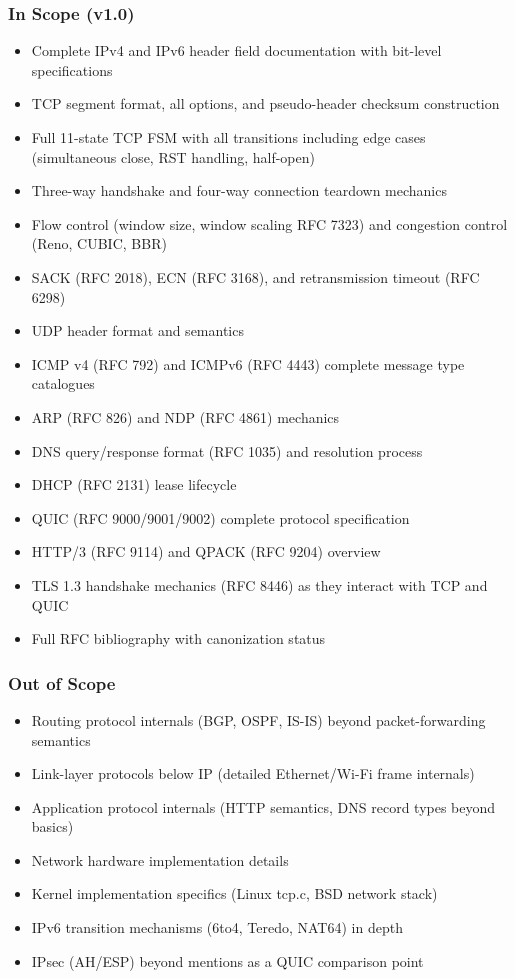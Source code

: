 \documentclass[11pt,letterpaper]{article}
\begin{document}
\subsubsection{In Scope (v1.0)}

\begin{itemize}[noitemsep]
  \item Complete IPv4 and IPv6 header field documentation with bit-level specifications
  \item TCP segment format, all options, and pseudo-header checksum construction
  \item Full 11-state TCP FSM with all transitions including edge cases (simultaneous close, RST handling, half-open)
  \item Three-way handshake and four-way connection teardown mechanics
  \item Flow control (window size, window scaling RFC 7323) and congestion control (Reno, CUBIC, BBR)
  \item SACK (RFC 2018), ECN (RFC 3168), and retransmission timeout (RFC 6298)
  \item UDP header format and semantics
  \item ICMP v4 (RFC 792) and ICMPv6 (RFC 4443) complete message type catalogues
  \item ARP (RFC 826) and NDP (RFC 4861) mechanics
  \item DNS query/response format (RFC 1035) and resolution process
  \item DHCP (RFC 2131) lease lifecycle
  \item QUIC (RFC 9000/9001/9002) complete protocol specification
  \item HTTP/3 (RFC 9114) and QPACK (RFC 9204) overview
  \item TLS 1.3 handshake mechanics (RFC 8446) as they interact with TCP and QUIC
  \item Full RFC bibliography with canonization status
\end{itemize}

\subsubsection{Out of Scope}

\begin{itemize}[noitemsep]
  \item Routing protocol internals (BGP, OSPF, IS-IS) beyond packet-forwarding semantics
  \item Link-layer protocols below IP (detailed Ethernet/Wi-Fi frame internals)
  \item Application protocol internals (HTTP semantics, DNS record types beyond basics)
  \item Network hardware implementation details
  \item Kernel implementation specifics (Linux tcp.c, BSD network stack)
  \item IPv6 transition mechanisms (6to4, Teredo, NAT64) in depth
  \item IPsec (AH/ESP) beyond mentions as a QUIC comparison point
\end{itemize}
\end{document}
